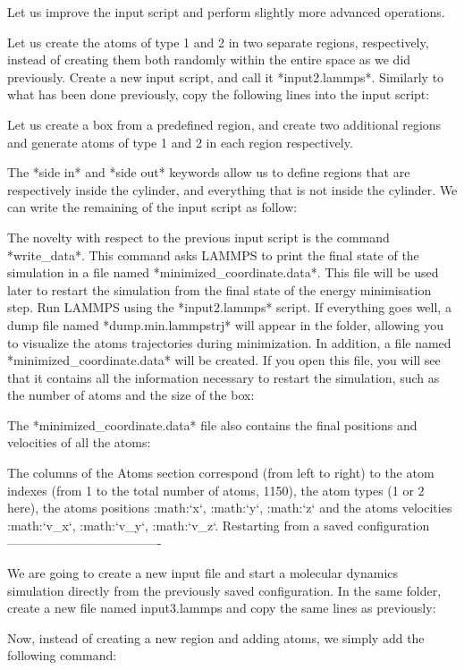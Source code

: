 Let us improve the input script and perform slightly more
advanced operations.

Let us create the atoms of type 1 and 2 in two separate
regions, respectively, instead of creating them both randomly 
within the entire space as we did previously. Create a new input script, and call
it *input2.lammps*. Similarly to what has been done previously, copy the following lines
into the input script:

Let us create a box from a predefined region,
and create two additional regions and generate
atoms of type 1 and 2 in each region respectively.

The *side in* and *side out* keywords
allow us to define regions that are respectively inside the
cylinder, and everything that is not inside the cylinder.
We can write the remaining of the input script as follow:

The novelty with respect to the previous
input script is the command *write_data*. This command
asks LAMMPS to print the final state of the simulation in
a file named *minimized_coordinate.data*. This file will
be used later to restart the simulation from the final
state of the energy minimisation step.
Run LAMMPS using the *input2.lammps* script. If everything
goes well, a dump file named *dump.min.lammpstrj* will
appear in the folder, allowing you to visualize the atoms
trajectories during minimization. In
addition, a file named *minimized_coordinate.data* will be
created. If you open this file, you will see that it
contains all the information necessary to restart the
simulation, such as the number of atoms and the size of
the box:

The *minimized_coordinate.data* file also contains the final
positions and velocities of all the atoms:

The columns of the Atoms section
correspond (from left to right) to the atom indexes (from 1
to the total number of atoms, 1150), the atom types (1 or 2
here), the atoms positions :math:`x`, :math:`y`, :math:`z` and the
atoms velocities :math:`v_x`, :math:`v_y`, :math:`v_z`.
Restarting from a saved configuration
-------------------------------------

We are going to create a new input file and start a
molecular dynamics simulation directly from the previously
saved configuration. In the same folder, create a new file
named input3.lammps and copy the same lines as previously:

Now, instead of creating a new region and adding atoms, we
simply add the following command:

